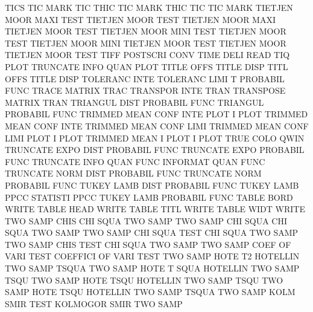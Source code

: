 TICS                                    TIC      MARK
TIC      THIC                           TIC      MARK THIC
TIC                                     TIC      MARK
TIETJEN  MOOR MAXI TEST                 TIETJEN  MOOR TEST
TIETJEN  MOOR MAXI                      TIETJEN  MOOR TEST
TIETJEN  MOOR MINI TEST                 TIETJEN  MOOR TEST
TIETJEN  MOOR MINI                      TIETJEN  MOOR TEST
TIETJEN  MOOR                           TIETJEN  MOOR TEST
TIFF                                    POSTSCRI CONV
TIME     DELI                           READ
TIQ      PLOT                           TRUNCATE INFO QUAN PLOT
TITLE    OFFS                           TITLE    DISP
TITL     OFFS                           TITLE    DISP
TOLERANC INTE                           TOLERANC LIMI
T                                       PROBABIL FUNC
TRACE                                   MATRIX   TRAC
TRANSPOR INTE                           TRAN
TRANSPOSE                               MATRIX   TRAN
TRIANGUL DIST                           PROBABIL FUNC
TRIANGUL                                PROBABIL FUNC
TRIMMED  MEAN CONF INTE PLOT            I        PLOT
TRIMMED  MEAN CONF INTE                 TRIMMED  MEAN CONF LIMI
TRIMMED  MEAN CONF LIMI PLOT            I        PLOT
TRIMMED  MEAN I    PLOT                 I        PLOT
TRUE     COLO                           QWIN
TRUNCATE EXPO DIST                      PROBABIL FUNC
TRUNCATE EXPO                           PROBABIL FUNC
TRUNCATE INFO QUAN FUNC                 INFORMAT QUAN FUNC
TRUNCATE NORM DIST                      PROBABIL FUNC
TRUNCATE NORM                           PROBABIL FUNC
TUKEY    LAMB DIST                      PROBABIL FUNC
TUKEY    LAMB PPCC                      STATISTI PPCC
TUKEY    LAMB                           PROBABIL FUNC
TABLE    BORD                           WRITE
TABLE    HEAD                           WRITE
TABLE    TITL                           WRITE
TABLE    WIDT                           WRITE
TWO      SAMP CHIS                      CHI      SQUA TWO  SAMP
TWO      SAMP CHI  SQUA                 CHI      SQUA TWO  SAMP
TWO      SAMP CHI  SQUA TEST            CHI      SQUA TWO  SAMP
TWO      SAMP CHIS TEST                 CHI      SQUA TWO  SAMP
TWO      SAMP COEF OF   VARI TEST       COEFFICI OF   VARI TEST
TWO      SAMP HOTE T2                   HOTELLIN TWO  SAMP TSQUA
TWO      SAMP HOTE T    SQUA            HOTELLIN TWO  SAMP TSQU
TWO      SAMP HOTE TSQU                 HOTELLIN TWO  SAMP TSQU
TWO      SAMP HOTE TSQU                 HOTELLIN TWO  SAMP TSQUA
TWO      SAMP KOLM SMIR TEST            KOLMOGOR SMIR TWO  SAMP
